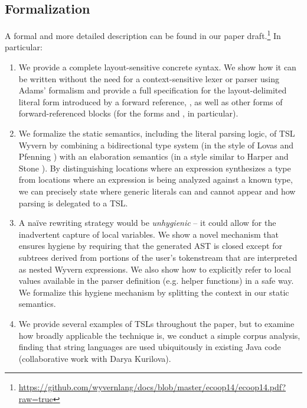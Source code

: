 {\subsection{Formalization}
A formal and more detailed description can be found in our paper draft.\footnote{\url{https://github.com/wyvernlang/docs/blob/master/ecoop14/ecoop14.pdf?raw=true}} In particular:
\begin{enumerate}
\item We provide a complete layout-sensitive concrete syntax. We show how it can be written without the need for a context-sensitive lexer or parser using Adams' formalism and provide a full specification for the layout-delimited literal form introduced by a forward reference, \li{~}, as well as other forms of forward-referenced blocks (for the forms  and , in particular).
\item We formalize the static semantics, including the literal parsing logic, of TSL Wyvern by combining a bidirectional type system (in the style of Lovas and Pfenning \cite{Lovas08abidirectional}) with an elaboration semantics (in a style similar to Harper and Stone \cite{Harper00atype-theoretic}). By distinguishing locations where an expression synthesizes a type from locations where an expression is being analyzed against a known type, we can precisely state where generic literals can and cannot appear and how parsing is delegated to a TSL.
\item A na\"ive rewriting strategy would be \emph{unhygienic} -- it could allow for the inadvertent capture of local variables. We show a novel mechanism that ensures hygiene by requiring that the generated AST is closed except for subtrees derived from portions of the user's tokenstream that are interpreted as nested Wyvern expressions. We also show how to explicitly refer to local values available in the parser definition (e.g. helper functions) in a safe way. We formalize this hygiene mechanism by splitting the context in our static semantics.
\item We provide several examples of TSLs throughout the paper, but to examine how broadly applicable the technique is, we conduct a simple corpus analysis, finding that string languages are used ubiquitously in existing Java code  (collaborative work with Darya Kurilova).
\end{enumerate}

}
